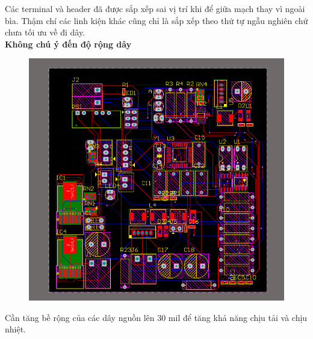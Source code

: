 Các terminal và header đã được sắp xếp sai vị trí khi để giữa mạch thay vì ngoài bìa. Thậm chí các linh kiện khác cũng chỉ là sắp xếp theo thứ tự ngẫu nghiên chứ chưa tối ưu về đi dây.\\
\cleardoublepage
\textbf{Không chú ý đến độ rộng dây}
\begin{figure}[H]
    \centering
    \includegraphics[width=1\textwidth]{pictures/7p.png}
\end{figure}
Cần tăng bề rộng của các dây nguồn lên 30 mil để tăng khả năng chịu tải và chịu nhiệt.\\